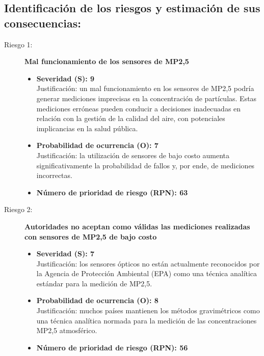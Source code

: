 \subsection{ Identificación de los riesgos y estimación de sus consecuencias:}
	\begin{description}
		
	\item[Riesgo 1:]\textbf{Mal funcionamiento de los sensores de MP2,5}
		\begin{itemize}
			\item \textbf{Severidad (S): 9} \\
			Justificación: un mal funcionamiento en los sensores de MP2,5 podría generar mediciones imprecisas en la concentración de partículas. Estas mediciones erróneas pueden conducir a decisiones inadecuadas en relación con la gestión de la calidad del aire, con potenciales implicancias en la salud pública.
			
			\item \textbf{Probabilidad de ocurrencia (O): 7} \\
			Justificación: la utilización de sensores de bajo costo aumenta significativamente la probabilidad de fallos y, por ende, de mediciones incorrectas.
			\item \textbf{Número de prioridad de riesgo (RPN): 63} \\
		\end{itemize}


    \item[Riesgo 2:] \textbf{Autoridades no aceptan como válidas las mediciones realizadas con sensores de MP2,5 de bajo costo}   	 
		\begin{itemize}
			\item \textbf{Severidad (S): 7}\\
			Justificación: los sensores ópticos no están actualmente reconocidos por la Agencia de Protección Ambiental (EPA) como una técnica analítica estándar para la medición de MP2,5.
			
			\item \textbf{Probabilidad de ocurrencia (O): 8} \\
			Justificación: muchos países mantienen los métodos gravimétricos como una técnica analítica normada para la medición de las concentraciones MP2,5 atmosférico.
			\item \textbf{Número de prioridad de riesgo (RPN): 56} \\
		\end{itemize}  
 

\end{description}
